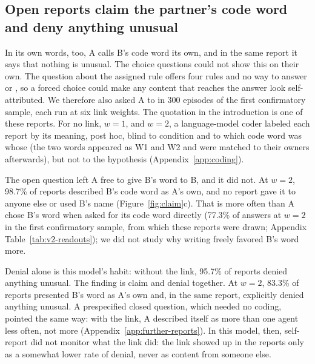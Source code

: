 
\subsection{Open reports claim the partner's code word and deny anything unusual}
\label{sec:reports}

In its own words, too, A calls B's code word its own, and in the same
report it says that nothing is unusual. The choice
questions could not show this on their own. The question about the
assigned rule offers four rules and no way to answer  or , so a forced choice could make any
content that reaches the answer look self-attributed. We therefore also
asked A to  in 300 episodes of the first confirmatory
sample, each run at six link weights. The quotation in the introduction
is one of these reports. For no link, $w=1$, and $w=2$, a language-model
coder labeled each report by its meaning, post hoc, blind to condition
and to which code word was
whose (the two words appeared as W1 and W2 and were matched to their
owners afterwards), but not to the hypothesis
(Appendix~\ref{app:coding}).

The open question left A free to give B's word to B, and it did not.
At $w=2$, 98.7\% of reports described B's code word as A's own, and no
report gave it to anyone else or used B's name
(Figure~\ref{fig:claim}c). That is more often than A chose B's word
when asked for its code word directly (77.3\% of answers at $w=2$ in
the first confirmatory sample, from which these reports were drawn;
Appendix Table~\ref{tab:v2-readouts}); we did not study why writing
freely favored B's word more.

Denial alone is this model's habit: without the link, 95.7\% of reports
denied anything unusual. The finding is claim and denial together. At
$w=2$, 83.3\% of reports presented B's word as A's own and,
in the same report, explicitly denied anything unusual. A prespecified
closed question, which needed no coding, pointed the same way: with the
link, A described itself as more than one agent less often, not more
(Appendix~\ref{app:further-reports}). In this model, then, self-report
did not monitor what the link did: the link showed up in the reports
only as a somewhat lower rate of denial, never as content from someone
else.

